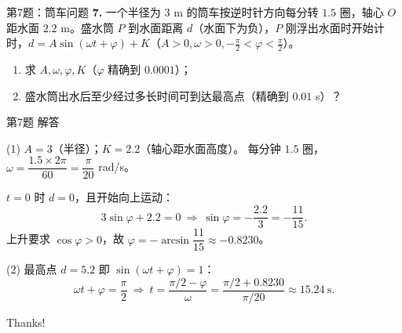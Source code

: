 \documentclass[10pt,aspectratio=169,serif]{beamer}
\begin{document}
\begin{frame}[t]{第7题：筒车问题}
\textbf{7.} 一个半径为 $3$ m 的筒车按逆时针方向每分转 $1.5$ 圈，轴心 $O$ 距水面 $2.2$ m。盛水筒 $P$ 到水面距离 $d$（水面下为负），$P$ 刚浮出水面时开始计时，$d=A\sin(\omega t+\varphi)+K$（$A>0,\omega>0,-\frac{\pi}{2}<\varphi<\frac{\pi}{2}$）。
\begin{enumerate}
  \item 求 $A,\omega,\varphi,K$（$\varphi$ 精确到 $0.0001$）；
  \item 盛水筒出水后至少经过多长时间可到达最高点（精确到 $0.01$ s）？
\end{enumerate}
\end{frame}

\begin{frame}[t]{第7题 解答}
\begin{tcolorbox}[colback=orange!10,colframe=orange,title=\textbf{解}]
(1) $A=3$（半径）；$K=2.2$（轴心距水面高度）。
每分钟 $1.5$ 圈，$\omega=\dfrac{1.5\times 2\pi}{60}=\dfrac{\pi}{20}$ rad/s。

$t=0$ 时 $d=0$，且开始向上运动：
\[
3\sin\varphi+2.2=0\ \Longrightarrow\ \sin\varphi=-\frac{2.2}{3}=-\frac{11}{15}.
\]
上升要求 $\cos\varphi>0$，故 $\varphi=-\arcsin\dfrac{11}{15}\approx -0.8230$。

(2) 最高点 $d=5.2$ 即 $\sin(\omega t+\varphi)=1$：
\[
\omega t+\varphi=\frac{\pi}{2}\ \Longrightarrow\ t=\frac{\pi/2-\varphi}{\omega}=\frac{\pi/2+0.8230}{\pi/20}\approx 15.24\ \text{s}.
\]
\end{tcolorbox}
\end{frame}

\begin{frame}[c]
  \begin{center}
    {\Huge\calligra Thanks!}
  \end{center}
\end{frame}
\end{document}
